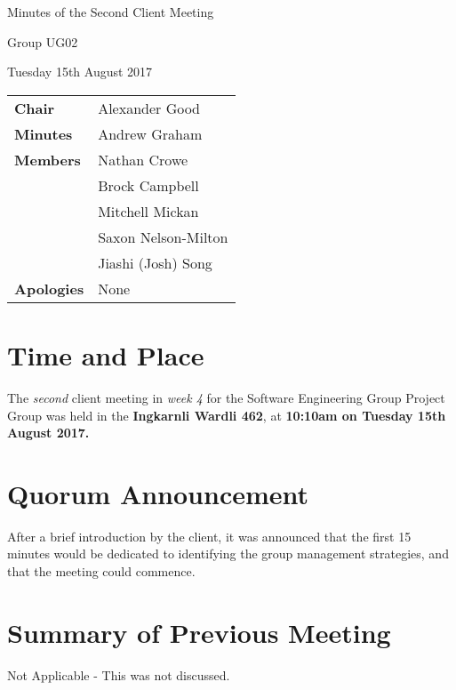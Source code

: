 \documentclass{article}
\begin{document}
\begin{center}    
{\huge Minutes of the Second Client Meeting \par}
\vspace{0.5cm}
{\large Group UG02 \par}
\vspace{0.5cm}
{\large Tuesday 15th August 2017 \par}
\vspace{0.5cm}
\end{center}

\begin{flushleft}
\begin{tabular}{ll}
{\bfseries Chair} & Alexander Good \\
{\bfseries Minutes} & Andrew Graham \\
{\bfseries Members} & Nathan Crowe \\
 & Brock Campbell \\
 & Mitchell Mickan \\
 & Saxon Nelson-Milton \\
 & Jiashi (Josh) Song \\
{\bfseries Apologies} & None\\
\end{tabular}
\end{flushleft}

\section{Time and Place}
The {\itshape second} client meeting in {\itshape week 4} for the Software Engineering Group Project Group was held in the {\bfseries Ingkarnli Wardli 462}, at {\bfseries 10:10am on Tuesday 15th August 2017.} 

\section{Quorum Announcement}
	After a brief introduction by the client, it was announced that the first 15 minutes would be dedicated to identifying the group management strategies, and that the meeting could commence.
    
\section{Summary of Previous Meeting}
 	Not Applicable - This was not discussed.
\end{document}
